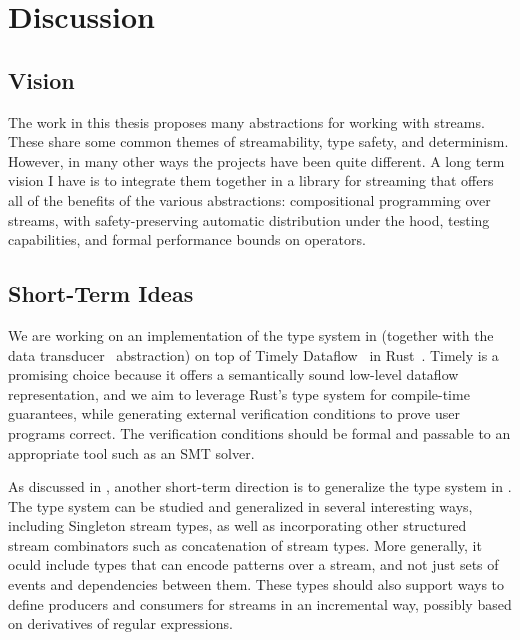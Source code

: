\chapter{Discussion}
\label{cha:discussion}


\section{Vision}

The work in this thesis proposes many abstractions for working with streams. These share some common themes of streamability, type safety, and determinism.
However, in many other ways the projects have been quite different.
A long term vision I have is to integrate them together in a library for streaming that offers all of the benefits of the various abstractions:
compositional programming over streams, with safety-preserving automatic distribution under the hood, testing capabilities, and formal performance bounds on operators.

\section{Short-Term Ideas}

We are working on an implementation of the type system in  (together with the data transducer~ abstraction) on top of Timely Dataflow~\cite{Timely,Naiad2013} in Rust~\cite{RustLang}.
Timely is a promising choice because it offers a semantically sound low-level dataflow representation,
and we aim to leverage Rust's type system for compile-time guarantees,
while generating external verification conditions to prove user programs correct.
The verification conditions should be formal and passable to an appropriate tool such as an SMT solver.

As discussed in , another short-term direction is to generalize the type system in .
The type system can be studied and generalized in several interesting ways, including Singleton stream types, as well as incorporating other structured stream combinators such as concatenation of stream types.
More generally, it oculd include types that can encode patterns over a stream, and not just sets of events and dependencies between them.
These types should also support ways to define producers and consumers for streams in an incremental way, possibly based on derivatives of regular expressions.

